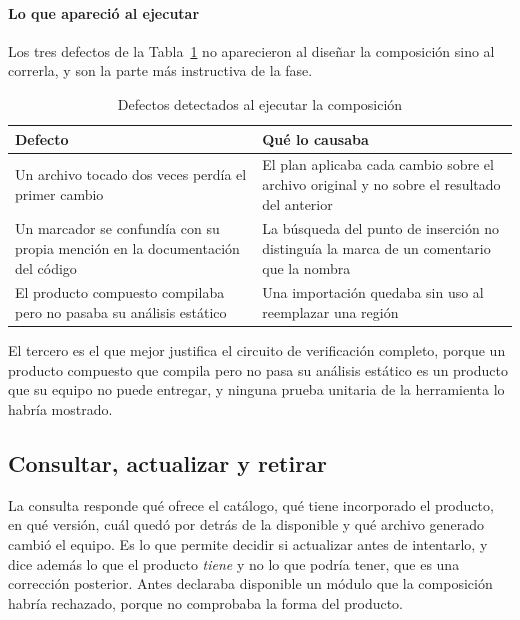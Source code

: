 \paragraph*{Lo que apareció al ejecutar}

Los tres defectos de la Tabla~\ref{tab:defectos-composicion} no aparecieron
al diseñar la composición sino al correrla, y son la parte más instructiva de
la fase.

\begin{table}[H]
\centering
{\footnotesize
\begin{tabular}{p{4.9cm}p{9.8cm}}
\toprule
\textbf{Defecto} & \textbf{Qué lo causaba} \\
\midrule
Un archivo tocado dos veces perdía el primer cambio & El plan aplicaba cada cambio sobre el archivo original y no sobre el resultado del anterior \\
Un marcador se confundía con su propia mención en la documentación del código & La búsqueda del punto de inserción no distinguía la marca de un comentario que la nombra \\
El producto compuesto compilaba pero no pasaba su análisis estático & Una importación quedaba sin uso al reemplazar una región \\
\bottomrule
\end{tabular}
}
\caption{Defectos detectados al ejecutar la composición}
\label{tab:defectos-composicion}
\end{table}

El tercero es el que mejor justifica el circuito de verificación completo,
porque un producto compuesto que compila pero no pasa su análisis estático es un
producto que su equipo no puede entregar, y ninguna prueba unitaria de la
herramienta lo habría mostrado.

\subsection{Consultar, actualizar y retirar}
\label{sec:consulta-actualizacion}

La consulta responde qué ofrece el catálogo, qué tiene incorporado el
producto, en qué versión, cuál quedó por detrás de la disponible y qué archivo
generado cambió el equipo. Es lo que permite decidir si actualizar antes de
intentarlo, y dice además lo que el producto \emph{tiene} y no lo que podría
tener, que es una corrección posterior. Antes declaraba disponible un módulo
que la composición habría rechazado, porque no comprobaba la forma del
producto.

